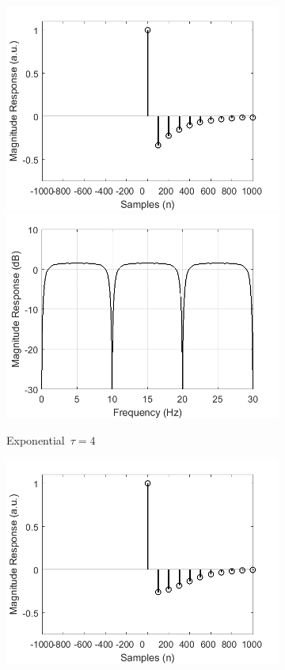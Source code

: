 \documentclass[a4paper]{article}
\begin{document}
\begin{figure}[hbtp]
\begin{subfigure}{.245\textwidth}
        \includegraphics[width=\textwidth]{img/causal/kernel_exp.png}\\
        \includegraphics[width=\textwidth]{img/causal/mag_exp.png}
        \caption{Exponential~$\tau=4$}\label{fig:ExponentialKernel}
    \end{subfigure}
    \begin{subfigure}{.245\textwidth}
        \includegraphics[width=\textwidth]{img/causal/kernel_gauss.png}\\

\end{subfigure}
\end{figure}
\end{document}
